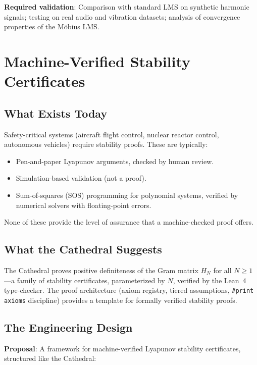\documentclass[11pt,a4paper]{article}
\begin{document}
\textbf{Required validation}: Comparison with standard LMS on
synthetic harmonic signals; testing on real audio and vibration
datasets; analysis of convergence properties of the M\"obius LMS.

\section{Machine-Verified Stability Certificates}
\label{sec:lyapunov}

\subsection{What Exists Today}

Safety-critical systems (aircraft flight control, nuclear reactor
control, autonomous vehicles) require stability proofs. These are
typically:
\begin{itemize}
  \item Pen-and-paper Lyapunov arguments, checked by human review.
  \item Simulation-based validation (not a proof).
  \item Sum-of-squares (SOS) programming for polynomial systems,
    verified by numerical solvers with floating-point errors.
\end{itemize}

None of these provide the level of assurance that a machine-checked
proof offers.

\subsection{What the Cathedral Suggests}

The Cathedral proves positive definiteness of the Gram matrix
$H_N$ for all $N \geq 1$---a family of stability certificates,
parameterized by $N$, verified by the Lean~4 type-checker. The
proof architecture (axiom registry, tiered assumptions,
\texttt{\#print axioms} discipline) provides a template for
formally verified stability proofs.

\subsection{The Engineering Design}

\textbf{Proposal}: A framework for machine-verified Lyapunov
stability certificates, structured like the Cathedral:
\end{document}
